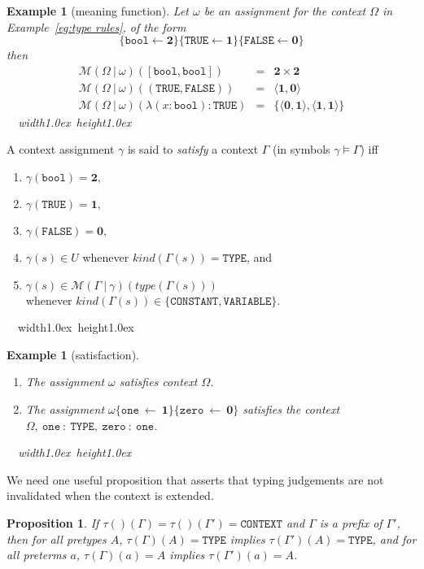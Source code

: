 \documentclass [12pt,twoside]{cslreport}
\newcommand{\thmbox}
   {{\ \hfill\hbox{%
      \vrule width1.0ex height1.0ex
   }\parfillskip 0pt }}
\newtheorem{prop}[thm]{Proposition}
\newcommand{\tuple}[1]{\langle #1 \rangle}
\newtheorem{example}[thm]{Example}
\newcommand{\tupletype}[1]{[#1]}
\newcommand{\tauGamma}[1]{\tau(\Gamma)(#1)}
\newcommand{\Mgamma}[1]{{\mathcal M}(\Gamma\vbar\gamma)(#1)}
\newcommand{\twob}{\mathbf{2}}
\newcommand{\oneb}{\mathbf{1}}
\newcommand{\zerob}{\mathbf{0}}
\newcommand{\ttbool}{\mathtt{bool}}
\newcommand{\tttrue}{\mathtt{TRUE}}
\newcommand{\ttfalse}{\mathtt{FALSE}}
\newcommand{\tttype}{\mathtt{TYPE}}
\newcommand{\ttcontext}{\mathtt{CONTEXT}}
\newcommand{\ttconstant}{\mathtt{CONSTANT}}
\newcommand{\ttvariable}{\mathtt{VARIABLE}}
\newcommand{\itkind}{\textit{kind}}
\newcommand{\ittype}{\textit{type}}
\newcommand{\vbar}{\ |\ }
\newenvironment{Eg}[1]{\begin{example}[#1]\label{eg:#1}\em }{\thmbox\end{example}}
\newenvironment{Defn}[1]{\begin{definition}[#1]\label{defn:#1}}{
\thmbox\end{definition}}
\begin{document}
\begin{Eg}{meaning function}
 Let $\omega$ be an assignment for the context $\Omega$ in
Example~\ref{eg:type rules}, of the form
$$\{\ttbool\gets \twob\}\{ \mathtt{TRUE}\gets \oneb\}\{
\mathtt{FALSE}\gets \zerob\}$$
then
\begin{eqnarray*}
\mathcal{M}(\Omega\vbar \omega)(\tupletype{\ttbool, \ttbool}) & = &
\twob\times\twob\\
%
\mathcal{M}(\Omega\vbar \omega)(( \mathtt{TRUE}, \mathtt{FALSE})) & = &
\tuple{\oneb, \zerob}\\
%
\mathcal{M}(\Omega\vbar \omega)(\lambda (x : \ttbool): \mathtt{TRUE}) & = &
\{\tuple{\zerob, \oneb}, \tuple{\oneb, \oneb}\}
\end{eqnarray*}
\end{Eg}

\begin{Defn}{satisfaction}
A context assignment $\gamma$ is said to \emph{satisfy} a context $\Gamma$
(in symbols $\gamma\models \Gamma$) 
iff
\begin{enumerate}
 \item $\gamma(\ttbool) = {\twob},$
 \item $\gamma(\tttrue) = {\oneb},$
 \item $\gamma(\ttfalse) = {\zerob},$
\item $\gamma(s)\in U$ whenever $ \itkind{}(\Gamma(s)) = \tttype$, and
 \item $\gamma(s) \in \Mgamma{ \ittype{}(\Gamma(s))}$\hfill\\\hspace*{1in}
whenever $ \itkind{}(\Gamma(s)) \in \{ \ttconstant,
\ttvariable \}$.
\end{enumerate}
\end{Defn}
\begin{Eg}{satisfaction}\hfill\\\begin{enumerate}
\item The assignment $\omega$ satisfies context $\Omega$.

\item The assignment $\omega \{ \mathtt{one}~\gets~{\oneb}\}\{
\mathtt{zero}~\gets~\zerob\}$ satisfies the context
$\Omega,~\mathtt{one~:~TYPE},~\mathtt{zero~:~one}$\@.  
\end{enumerate}
\end{Eg}

We need one useful proposition that asserts that typing judgements are not
invalidated when the context is extended.
\begin{prop}\label{context-weakening} %
If $\tau()(\Gamma) = \tau()(\Gamma') = \ttcontext$ and $\Gamma$ is
a prefix of $\Gamma'$, then for all pretypes $A$, $\tauGamma{A} = \tttype$
implies $\tau(\Gamma')(A) = \tttype$, and for all preterms $a$,
$\tauGamma{a} = A$ implies $\tau(\Gamma')(a) = A$\@.  
\end{prop}
\end{document}
